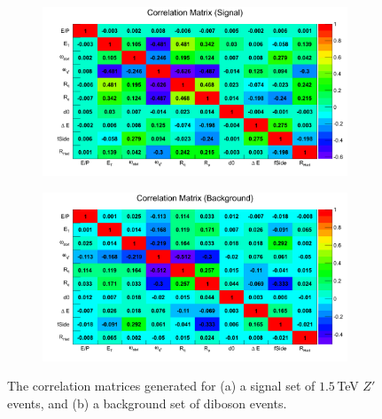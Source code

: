 \documentclass{article}
\begin{document}
\begin{figure}[htb]
    \begin{subfigure}{.7\textwidth}
        \includegraphics[height=0.7\textwidth]{images/variables/correlationMatrixSignal.png}
        \caption{}
        \label{fig:cmSignal}
    \end{subfigure}	
    \begin{subfigure}{.7\textwidth}
        \includegraphics[height=0.7\textwidth]{images/variables/correlationMatrixBackground.png}
        \caption{}
        \label{fig:cmBackground}
    \end{subfigure}
    \caption{ The correlation matrices generated for (a) a signal set of $1.5\,$TeV $Z'$ events, and (b) a background set of diboson events.  \label{fig:correlationMatrix}}
\end{figure}
\end{document}
